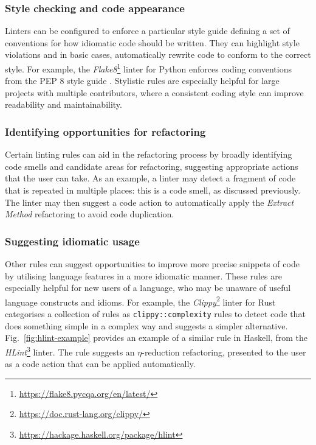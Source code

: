 \subsubsection{Style checking and code appearance}
Linters can be configured to enforce a particular style guide defining a set of conventions for how idiomatic code should be written.
They can highlight style violations and in basic cases, automatically rewrite code to conform to the correct style.
For example, the \textit{Flake8}\footnote{\url{https://flake8.pycqa.org/en/latest/}} linter for Python enforces coding conventions from the PEP 8 style guide .
Stylistic rules are especially helpful for large projects with multiple contributors, where a consistent coding style can improve readability and maintainability.

\subsubsection{Identifying opportunities for refactoring}
Certain linting rules can aid in the refactoring process by broadly identifying code smells and candidate areas for refactoring, suggesting appropriate actions that the user can take.
As an example, a linter may detect a fragment of code that is repeated in multiple places: this is a code smell, as discussed previously.
The linter may then suggest a code action to automatically apply the \textit{Extract Method} refactoring to avoid code duplication.

\subsubsection{Suggesting idiomatic usage}
Other rules can suggest opportunities to improve more precise snippets of code by utilising language features in a more idiomatic manner.
These rules are especially helpful for new users of a language, who may be unaware of useful language constructs and idioms.
For example, the \textit{Clippy}\footnote{\url{https://doc.rust-lang.org/clippy/}} linter for Rust  categorises a collection of rules as \texttt{clippy::complexity} rules to detect code that does something simple in a complex way and suggests a simpler alternative.
Fig.~\ref{fig:hlint-example} provides an example of a similar rule in Haskell, from the \textit{HLint}\footnote{\url{https://hackage.haskell.org/package/hlint}} linter.
The rule suggests an $\eta$-reduction refactoring, presented to the user as a code action that can be applied automatically.

